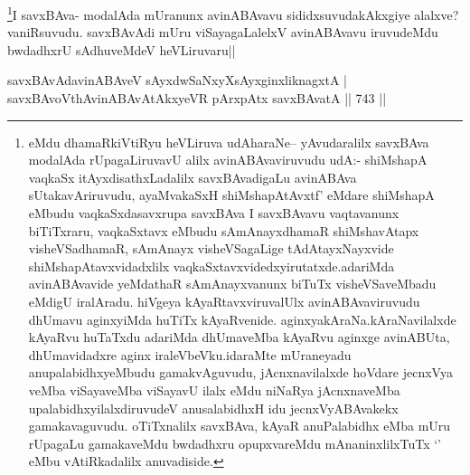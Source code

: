\begin{artha}
\footnote{\stext \stext  eMdu dhamaRkiVtiRyu heVLiruva udAharaNe-- yAvudaralilx savxBAva modalAda rUpagaLiruvavU alilx avinABAvaviruvudu udA:- shiMshapA vaqkaSx itAyxdisathxLadalilx savxBAvadigaLu avinABAva sUtakavAriruvudu, ayaMvakaSxH shiMshapAtAvxtf' eMdare shiMshapA eMbudu vaqkaSxdasavxrupa savxBAva I savxBAvavu vaqtavanunx biTiTxraru, vaqkaSxtavx eMbudu sAmAnayxdhamaR shiMshavAtapx visheVSadhamaR, sAmAnayx visheVSagaLige tAdAtayxNayxvide shiMshapAtavxvidadxlilx vaqkaSxtavxvidedxyirutatxde.adariMda avinABAvavide yeMdathaR sAmAnayxvanunx biTuTx visheVSaveMbadu eMdigU iralAradu. hiVgeya kAyaRtavxviruvalUlx avinABAvaviruvudu dhUmavu aginxyiMda huTiTx kAyaRvenide. aginxyakAraNa.kAraNavilalxde kAyaRvu huTaTxdu adariMda dhUmaveMba kAyaRvu aginxge avinABUta, dhUmavidadxre aginx iraleVbeVku.idaraMte mUraneyadu anupalabidhxyeMbudu gamakvAguvudu, jAcnxnavilalxde hoVdare jecnxVya veMba viSayaveMba viSayavU ilalx eMdu niNaRya jAcnxnaveMba upalabidhxyilalxdiruvudeV anusalabidhxH idu jecnxVyABAvakekx gamakavaguvudu. oTiTxnalilx savxBAva, kAyaR anuPalabidhx eMba mUru rUpagaLu gamakaveMdu bwdadhxru opupxvareMdu mAnaninxlilxTuTx `\stext' eMbu vAtiRkadalilx anuvadiside.}I savxBAva- modalAda mUranunx avinABAvavu sididxsuvudakAkxgiye alalxve? vaniRsuvudu. savxBAvAdi mUru viSayagaLalelxV avinABAvavu iruvudeMdu bwdadhxrU sAdhuveMdeV heVLiruvaru||
\end{artha}


\begin{shl}
savxBAvAdavinABAveV sAyxdwSaNxyXsAyxginxliknagxtA | \\
savxBAvoV\s thAvinABAvAtAkxyeVR pArxpAtx savxBAvatA \hfill||  743 ||  
\end{shl}

